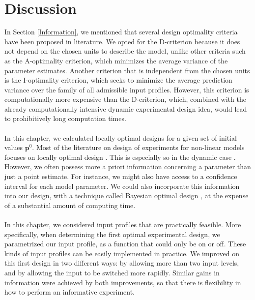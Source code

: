 \section{Discussion}
\label{Discussion}
In Section \ref{Information}, we mentioned that several design optimality criteria have been proposed in literature. We opted for the D-criterion because it does not depend on the chosen units to describe the model, unlike other criteria such as the A-optimality criterion, which minimizes the average variance of the parameter estimates. Another criterion that is independent from the chosen units is the I-optimality criterion, which seeks to minimize the average prediction variance over the family of all admissible input profiles. However, this criterion is computationally more expensive than the D-criterion, which, combined with the already computationally intensive dynamic experimental design idea, would lead to prohibitively long computation times.
\\
\\
In this chapter, we calculated locally optimal designs for a given set of initial values $\mathbf{p}^0$.  Most of the literature on design of experiments for non-linear models focuses on locally optimal design \parencite{fedorov}. This is especially so in the dynamic case \parencite{bernaerts1,bernaerts2,balsa1,balsa2,nahor1,nahor2}. However, we often possess more a priori information concerning a parameter than just a point estimate. For instance, we might also have access to a confidence interval for each model parameter. We could also incorporate this information into our design, with a technique called Bayesian optimal design \parencite{chaloner}, at the expense of a substantial amount of computing time. 
\\
\\
In this chapter, we considered input profiles that are practically feasible. More specifically, when determining the first optimal experimental design, we parametrized our input profile, as a function that could only be on or off. These kinds of input profiles can be easily implemented in practice. We improved on this first design in two different ways: by allowing more than two input levels, and by allowing the input to be switched more rapidly. Similar gains in information were achieved by both improvements, so that there is flexibility in how to perform an informative experiment.
\\
\\
